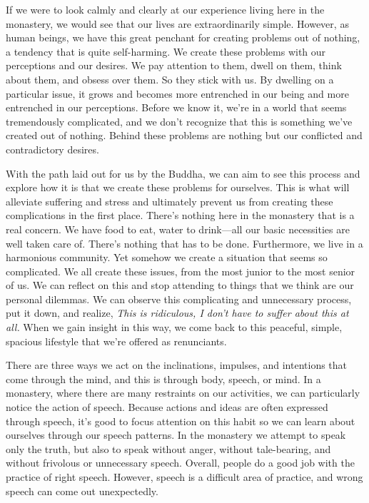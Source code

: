 
If we were to look calmly and clearly at our experience living here in 
the monastery, we would see that our lives are extraordinarily simple. 
However, as human beings, we have this great penchant for creating 
problems out of nothing, a tendency that is quite self-harming. We 
create these problems with our perceptions and our desires. We pay 
attention to them, dwell on them, think about them, and obsess over 
them. So they stick with us. By dwelling on a particular issue, it 
grows and becomes more entrenched in our being and more entrenched in 
our perceptions. Before we know it, we're in a world that seems 
tremendously complicated, and we don't recognize that this is something 
we've created out of nothing. Behind these problems are nothing but our 
conflicted and contradictory desires.

With the path laid out for us by the Buddha, we can aim to see this 
process and explore how it is that we create these problems for 
ourselves. This is what will alleviate suffering and stress and 
ultimately prevent us from creating these complications in the first 
place. There's nothing here in the monastery that is a real concern. We 
have food to eat, water to drink---all our basic necessities are well 
taken care of. There's nothing that has to be done. Furthermore, we 
live in a harmonious community. Yet somehow we create a situation that 
seems so complicated. We all create these issues, from the most junior 
to the most senior of us. We can reflect on this and stop attending to 
things that we think are our personal dilemmas. We can observe this 
complicating and unnecessary process, put it down, and realize, 
\emph{This is ridiculous, I don't have to suffer about this at all.} 
When we gain insight in this way, we come back to this peaceful, 
simple, spacious lifestyle that we're offered as renunciants.


There are three ways we act on the inclinations, impulses, and 
intentions that come through the mind, and this is through body, 
speech, or mind. In a monastery, where there are many restraints on our 
activities, we can particularly notice the action of speech. Because 
actions and ideas are often expressed through speech, it's good to 
focus attention on this habit so we can learn about ourselves through 
our speech patterns. In the monastery we attempt to speak only the 
truth, but also to speak without anger, without tale-bearing, and 
without frivolous or unnecessary speech. Overall, people do a good job 
with the practice of right speech. However, speech is a difficult area 
of practice, and wrong speech can come out unexpectedly.

